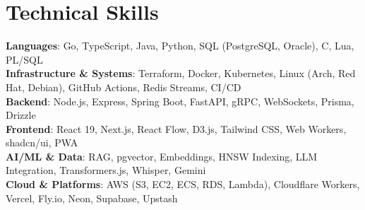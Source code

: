 \documentclass[a4paper,10pt]{article}
\begin{document}
\section{Technical Skills}
\begin{itemize}[leftmargin=0.15in, label={}]
  \small{
    \item{
      \textbf{Languages}{: Go, TypeScript, Java, Python, SQL (PostgreSQL, Oracle), C, Lua, PL/SQL} \\
      \textbf{Infrastructure \& Systems}{: Terraform, Docker, Kubernetes, Linux (Arch, Red Hat, Debian), GitHub Actions, Redis Streams, CI/CD} \\
      \textbf{Backend}{: Node.js, Express, Spring Boot, FastAPI, gRPC, WebSockets, Prisma, Drizzle} \\
      \textbf{Frontend}{: React 19, Next.js, React Flow, D3.js, Tailwind CSS, Web Workers, shadcn/ui, PWA} \\
      \textbf{AI/ML \& Data}{: RAG, pgvector, Embeddings, HNSW Indexing, LLM Integration, Transformers.js, Whisper, Gemini} \\
      \textbf{Cloud \& Platforms}{: AWS (S3, EC2, ECS, RDS, Lambda), Cloudflare Workers, Vercel, Fly.io, Neon, Supabase, Upstash}
    }
  }
\end{itemize}
\end{document}
